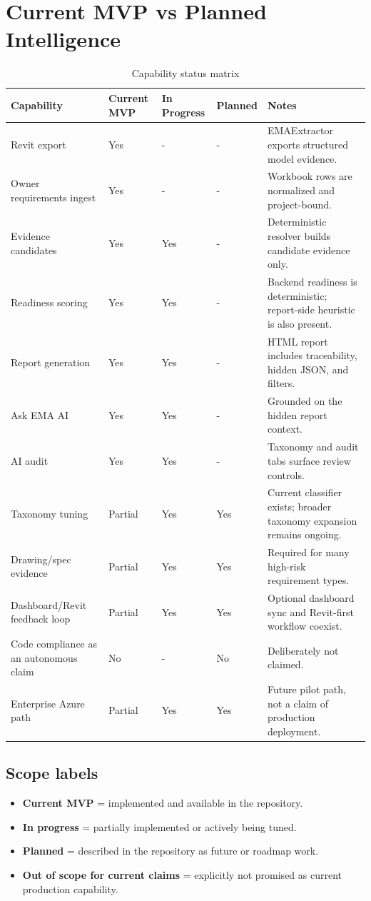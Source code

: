 \documentclass[10pt,letterpaper]{article}
\begin{document}
\section{Current MVP vs Planned Intelligence}

\small
\begin{longtable}{p{1.4in}p{0.95in}p{0.95in}p{0.95in}p{2.45in}}
\caption{Capability status matrix}\\
\toprule
\textbf{Capability} & \textbf{Current MVP} & \textbf{In Progress} & \textbf{Planned} & \textbf{Notes} \\
\midrule
\endhead
Revit export & Yes & - & - & EMAExtractor exports structured model evidence. \\
Owner requirements ingest & Yes & - & - & Workbook rows are normalized and project-bound. \\
Evidence candidates & Yes & Yes & - & Deterministic resolver builds candidate evidence only. \\
Readiness scoring & Yes & Yes & - & Backend readiness is deterministic; report-side heuristic is also present. \\
Report generation & Yes & Yes & - & HTML report includes traceability, hidden JSON, and filters. \\
Ask EMA AI & Yes & Yes & - & Grounded on the hidden report context. \\
AI audit & Yes & Yes & - & Taxonomy and audit tabs surface review controls. \\
Taxonomy tuning & Partial & Yes & Yes & Current classifier exists; broader taxonomy expansion remains ongoing. \\
Drawing/spec evidence & Partial & Yes & Yes & Required for many high-risk requirement types. \\
Dashboard/Revit feedback loop & Partial & Yes & Yes & Optional dashboard sync and Revit-first workflow coexist. \\
Code compliance as an autonomous claim & No & - & No & Deliberately not claimed. \\
Enterprise Azure path & Partial & Yes & Yes & Future pilot path, not a claim of production deployment. \\
\bottomrule
\end{longtable}
\normalsize

\subsection{Scope labels}

\begin{itemize}
  \item \textbf{Current MVP} = implemented and available in the repository.
  \item \textbf{In progress} = partially implemented or actively being tuned.
  \item \textbf{Planned} = described in the repository as future or roadmap work.
  \item \textbf{Out of scope for current claims} = explicitly not promised as current production capability.
\end{itemize}
\end{document}
